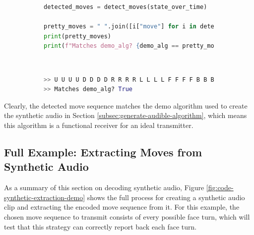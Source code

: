\begin{figure}[h]
\caption{Example move sequence extraction}
\label{fig:code-detect-moves-demo} 
\begin{subfigure}{\textwidth}
\begin{lstlisting}[language=Python]
detected_moves = detect_moves(state_over_time)

pretty_moves = " ".join([i["move"] for i in detected_moves])
print(pretty_moves)   
print(f"Matches demo_alg? {demo_alg == pretty_moves}") 
\end{lstlisting}
\end{subfigure}\\

\begin{subfigure}{\textwidth}
\begin{lstlisting}[language=Python, numbers=none]
>> U U U U D D D D R R R R L L L L F F F F B B B B
>> Matches demo_alg? True
\end{lstlisting}
\end{subfigure}
\end{figure}

Clearly, the detected move sequence matches the demo algorithm used to create the synthetic audio in Section \ref{subsec:generate-audible-algorithm}, which means this algorithm is a functional receiver for an ideal transmitter.

\subsection{Full Example: Extracting Moves from Synthetic Audio}
As a summary of this section on decoding synthetic audio, Figure \ref{fig:code-synthetic-extraction-demo} shows the full process for creating a synthetic audio clip and extracting the encoded move sequence from it.
For this example, the chosen move sequence to transmit consists of every possible face turn, which will test that this strategy can correctly report back each face turn.

